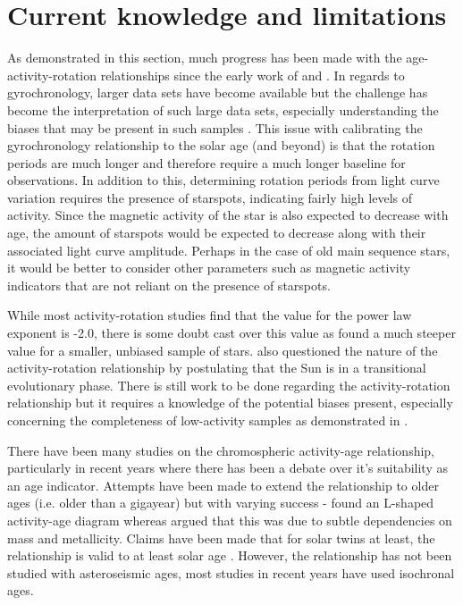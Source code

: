 \section{Current knowledge and limitations}
As demonstrated in this section, much progress has been made with the age-activity-rotation relationships since the early work of \citet{Kraft_1967} and \citet{Skumanich_1972}. In regards to gyrochronology, larger data sets have become available but the challenge has become the interpretation of such large data sets, especially understanding the biases that may be present in such samples \citep{van_Saders_etal_2019}. This issue with calibrating the gyrochronology relationship to the solar age (and beyond) is that the rotation periods are much longer and therefore require a much longer baseline for observations. In addition to this, determining rotation periods from light curve variation requires the presence of starspots, indicating fairly high levels of activity. Since the magnetic activity of the star is also expected to decrease with age, the amount of starspots would be expected to decrease along with their associated light curve amplitude. Perhaps in the case of old main sequence stars, it would be better to consider other parameters such as magnetic activity indicators that are not reliant on the presence of starspots.

While most activity-rotation studies find that the value for the power law exponent is -2.0, there is some doubt cast over this value as \citet{Wright_etal_2011} found a much steeper value for a smaller, unbiased sample of stars. \citet{Metcalfe_etal_2016} also questioned the nature of the activity-rotation relationship by postulating that the Sun is in a transitional evolutionary phase. There is still work to be done regarding the activity-rotation relationship but it requires a knowledge of the potential biases present, especially concerning the completeness of low-activity samples as demonstrated in \citet{Wright_etal_2011}.

There have been many studies on the chromospheric activity-age relationship, particularly in recent years where there has been a debate over it's suitability as an age indicator. Attempts have been made to extend the relationship to older ages (i.e. older than a gigayear) but with varying success - \citet{Pace_2013} found an L-shaped activity-age diagram whereas \citet{Lorenzo_Oliveira_etal_2016} argued that this was due to subtle dependencies on mass and metallicity. Claims have been made that for solar twins at least, the relationship is valid to at least solar age \citep{Lorenzo_Oliveira_etal_2018}. However, the relationship has not been studied with asteroseismic ages, most studies in recent years have used isochronal ages.

